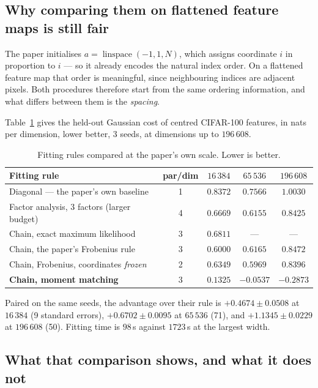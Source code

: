 \documentclass[11pt,a4paper]{article}
\begin{document}
\subsection{Why comparing them on flattened feature maps is still fair}

The paper initialises $a = \operatorname{linspace}(-1, 1, N)$, which assigns coordinate $i$ in
proportion to $i$ --- so it already encodes the natural index order. On a flattened feature map
that order is meaningful, since neighbouring indices are adjacent pixels. Both procedures
therefore start from the same ordering information, and what differs between them is the
\emph{spacing}.

Table~\ref{tab:exp25} gives the held-out Gaussian cost of centred CIFAR-100 features, in nats
per dimension, lower better, 3 seeds, at dimensions up to $196\,608$.

\begin{table}[htbp]
\centering
\caption{Fitting rules compared at the paper's own scale. Lower is better.}
\label{tab:exp25}
\begin{tabular}{@{}lcccc@{}}
\toprule
Fitting rule & par/dim & $16\,384$ & $65\,536$ & $196\,608$ \\
\midrule
Diagonal --- the paper's own baseline          & 1 & $0.8372$ & $0.7566$ & $1.0030$ \\
Factor analysis, 3 factors (larger budget)     & 4 & $0.6669$ & $0.6155$ & $0.8425$ \\
Chain, exact maximum likelihood                & 3 & $0.6811$ & ---      & ---      \\
Chain, the paper's Frobenius rule              & 3 & $0.6000$ & $0.6165$ & $0.8472$ \\
Chain, Frobenius, coordinates \emph{frozen}    & 2 & $0.6349$ & $0.5969$ & $0.8396$ \\
\textbf{Chain, moment matching}                & 3 & $\mathbf{0.1325}$ & $\mathbf{-0.0537}$ & $\mathbf{-0.2873}$ \\
\bottomrule
\end{tabular}
\end{table}

Paired on the same seeds, the advantage over their rule is $+0.4674 \pm 0.0508$ at $16\,384$
(9 standard errors), $+0.6702 \pm 0.0095$ at $65\,536$ (71), and $+1.1345 \pm 0.0229$ at
$196\,608$ (50). Fitting time is $98$\,s against $1723$\,s at the largest width.

\subsection{What that comparison shows, and what it does not}
\end{document}
